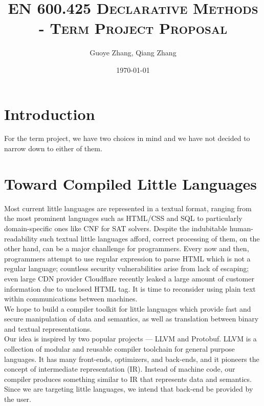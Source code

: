 \documentclass{article}
\begin{document}
\title{\textsc{EN 600.425 Declarative Methods \\ - Term Project Proposal}} %
\author{Guoye Zhang, Qiang Zhang\\
        }  %
\date{\today}  %
\maketitle

\section{Introduction}
For the term project, we have two choices in mind and we have not decided to narrow down to either of them. 


\section{Toward Compiled Little Languages}

Most current little languages are represented in a textual format, ranging from the most prominent languages such as HTML/CSS and SQL to particularly domain-specific ones like CNF for SAT solvers. Despite the indubitable human-readability such textual little languages afford, correct processing of them, on the other hand, can be a major chanllenge for programmers. Every now and then, programmers attempt to use regular expression to parse HTML which is not a regular language; countless security vulnerabilities arise from lack of escaping; even large CDN provider Cloudflare recently leaked a large amount of customer information due to unclosed HTML tag. It is time to reconsider using plain text within communications between machines.\\

We hope to build a compiler toolkit for little languages which provide fast and secure manipulation of data and semantics, as well as translation between binary and textual representations.\\

Our idea is inspired by two popular projects --- LLVM and Protobuf. LLVM is a collection of modular and reusable compiler toolchain for general purpose languages. It has many front-ends, optimizers, and back-ends, and it pioneers the concept of intermediate representation (IR). Instead of machine code, our compiler produces something similar to IR that represents data and semantics. Since we are targeting little languages, we intend that back-end be provided by the user.\\
\end{document}
